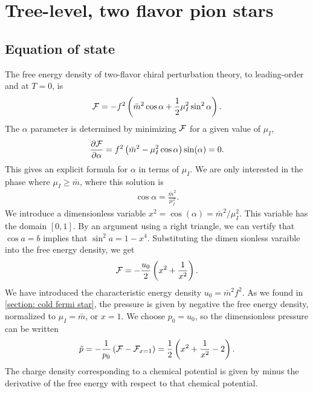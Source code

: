 \section{Tree-level, two flavor pion stars}


\subsection{Equation of state}
The free energy density of two-flavor chiral perturbation theory, to leading-order and at $T = 0$, is
%
\begin{equation}
    \mathcal{F} = - f^2 \left(\bar m^2 \cos \alpha + \frac{1}{2} \mu_I^2 \sin^2 \alpha\right).
\end{equation}
%
The $\alpha$ parameter is determined by minimizing $\mathcal{F}$ for a given value of $\mu_I$,
%
\begin{equation}
    \pdv{\mathcal{F}}{\alpha} = f^2 \left(\bar m^2 - \mu_I^2 \cos \alpha\right) \sin(\alpha) = 0.
\end{equation}
%
This gives an explicit formula for $\alpha$ in terms of $\mu_I$.
We are only interested in the phase where $\mu_I \geq \bar m$, where this solution is
%
\begin{align}
    \label{alpha as function of mu lowest order}
    \cos \alpha = \frac{\bar m^2}{\mu_I^2}.
\end{align}
%
We introduce a dimensionless variable $x^2 = \cos(\alpha) = \bar m^2 / \mu_I^2$.
This variable has the domain $[0, 1]$.
By an argument using a right triangle, we can vertify that $\cos a = b$ implies that $\sin^2 a = 1 - x^4$.
Substituting the dimen sionless varaible into the free energy density, we get 
%
\begin{equation}
    \mathcal{F} = - \frac{u_0}{2} \left( x^2 + \frac{1}{x^2} \right).
\end{equation}
%
We have introduced the characteristic energy density $u_0 = \bar m^2 f^2$.
As we found in \autoref{section: cold fermi star}, the pressure is given by negative the free energy density, normalized to $\mu_I = \bar m$, or $x = 1$.
We choose $p_0 = u_0$, so the dimensionless pressure can be written
%
\begin{equation}
    \label{pressure leading order chpt}
    \tilde p = -\frac{1}{p_0} \left(\mathcal{F} - \mathcal{F}_{x=1}\right) 
    = \frac{1}{2} \left( x^2 + \frac{1}{x^2} - 2 \right).
\end{equation}
%
The charge density corresponding to a chemical potential is given by minus the derivative of the free energy with respect to that chemical potential. 
